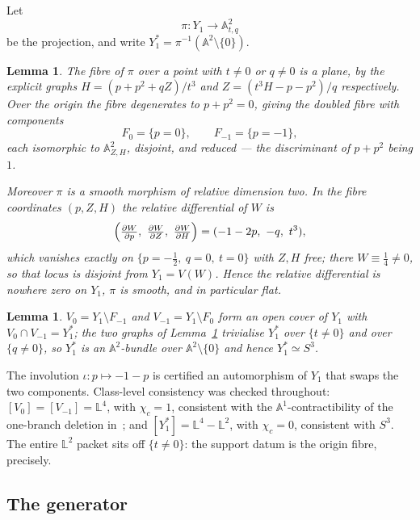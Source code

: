 \documentclass[11pt]{article}
\newtheorem{lemma}[theorem]{Lemma}
\theoremstyle{definition}
\theoremstyle{remark}
\newcommand{\Aff}[1]{\mathbb{A}^{#1}}
\newcommand{\Lef}{\mathbb{L}}
\newcommand{\chic}{\chi_c}
\begin{document}
Let
\begin{equation}\label{eq:pi}
\pi\colon Y_1\longrightarrow\Aff{2}_{t,q}
\end{equation}
be the projection, and write $Y_1^{*}=\pi^{-1}(\Aff{2}\setminus\{0\})$.

\begin{lemma}\label{lem:fibres}
The fibre of $\pi$ over a point with $t\ne0$ or $q\ne0$ is a plane, by the
explicit graphs $H=(p+p^2+qZ)/t^3$ and $Z=(t^3H-p-p^2)/q$ respectively. Over
the origin the fibre degenerates to $p+p^2=0$, giving the \emph{doubled fibre}
with components
\[
F_0=\{p=0\},\qquad F_{-1}=\{p=-1\},
\]
each isomorphic to $\Aff{2}_{Z,H}$, disjoint, and \emph{reduced} --- the
discriminant of $p+p^2$ being $1$.

Moreover $\pi$ is a \emph{smooth} morphism of relative dimension two. In the
fibre coordinates $(p,Z,H)$ the relative differential of $W$ is
\[
\Bigl(\tfrac{\partial W}{\partial p},\ \tfrac{\partial W}{\partial Z},\
\tfrac{\partial W}{\partial H}\Bigr)=(-1-2p,\ -q,\ t^3),
\]
which vanishes exactly on $\{p=-\tfrac12,\ q=0,\ t=0\}$ with $Z,H$ free; there
$W\equiv\tfrac14\ne0$, so that locus is disjoint from $Y_1=V(W)$. Hence the
relative differential is nowhere zero on $Y_1$, $\pi$ is smooth, and in
particular flat.
\end{lemma}

\begin{lemma}\label{lem:S3}
$V_0=Y_1\setminus F_{-1}$ and $V_{-1}=Y_1\setminus F_0$ form an open cover of
$Y_1$ with $V_0\cap V_{-1}=Y_1^{*}$; the two graphs of
Lemma~\ref{lem:fibres} trivialise $Y_1^{*}$ over $\{t\ne0\}$ and over
$\{q\ne0\}$, so $Y_1^{*}$ is an $\Aff{2}$-bundle over
$\Aff{2}\setminus\{0\}$ and hence $Y_1^{*}\simeq S^3$.
\end{lemma}

The involution $\iota\colon p\mapsto-1-p$ is certified an automorphism of
$Y_1$ that swaps the two components. Class-level consistency was checked
throughout: $[V_0]=[V_{-1}]=\Lef^4$, with $\chic=1$, consistent with the
$\Aff{1}$-contractibility of the one-branch deletion
in~\cite[Prop.~4.3.1]{ADO2021}; and $[Y_1^{*}]=\Lef^4-\Lef^2$, with
$\chic=0$, consistent with $S^3$. The entire $\Lef^2$ packet sits off
$\{t\ne0\}$: the support datum is the origin fibre, precisely.

\subsection{The generator}
\end{document}
